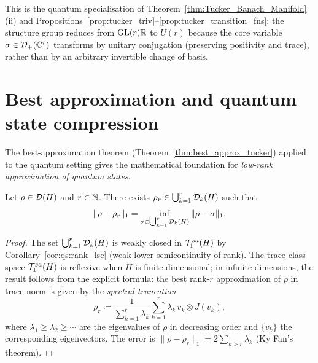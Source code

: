 This is the quantum specialisation of Theorem~\ref{thm:Tucker_Banach_Manifold}(ii)
and Propositions~\ref{prop:tucker_triv}--\ref{prop:tucker_transition_fns}:
the structure group reduces from $\mathrm{GL}(r){\mathbb{R}}$ to $U(r)$ because the
core variable $\sigma \in \mathcal{D}_+(\mathbb{C}^r)$ transforms by unitary
conjugation (preserving positivity and trace), rather than by
an arbitrary invertible change of basis.

\section{Best approximation and quantum state compression}
\label{sec:qs:approx}

The best-approximation theorem (Theorem~\ref{thm:best_approx_tucker})
applied to the quantum setting gives the mathematical foundation for
\emph{low-rank approximation of quantum states}.

\begin{theorem}
\label{thm:qs:best_approx}
Let $\rho \in \mathcal{D}(H)$ and $r \in \mathbb{N}$. There exists
$\rho_r \in \bigcup_{k=1}^r \mathcal{D}_{k}(H)$ such that
\begin{equation}
\label{eq:qs:best_approx}
    \|\rho - \rho_r\|_1
    = \inf_{\sigma \in \bigcup_{k=1}^r \mathcal{D}_{k}(H)} \|\rho - \sigma\|_1.
\end{equation}
\end{theorem}

\begin{proof}
The set $\bigcup_{k=1}^r \mathcal{D}_{k}(H)$ is weakly closed in
$\mathcal{T}_{1}^{sa}(H)$ by Corollary~\ref{cor:qs:rank_lsc} (weak lower
semicontinuity of rank). The trace-class space $\mathcal{T}_{1}^{sa}(H)$ is
reflexive when $H$ is finite-dimensional; in infinite dimensions,
the result follows from the explicit formula: the best rank-$r$
approximation of $\rho$ in trace norm is given by the \emph{spectral
truncation}
\begin{equation}
\label{eq:qs:spectral_trunc}
    \rho_r \coloneqq \frac{1}{\sum_{k=1}^r \lambda_k}
    \sum_{k=1}^r \lambda_k\, v_k \otimes J(v_k),
\end{equation}
where $\lambda_1 \geq \lambda_2 \geq \cdots$ are the eigenvalues of
$\rho$ in decreasing order and $\{v_k\}$ the corresponding eigenvectors.
The error is $\|\rho - \rho_r\|_1 = 2\sum_{k > r} \lambda_k$
(Ky Fan's theorem).
\end{proof}

